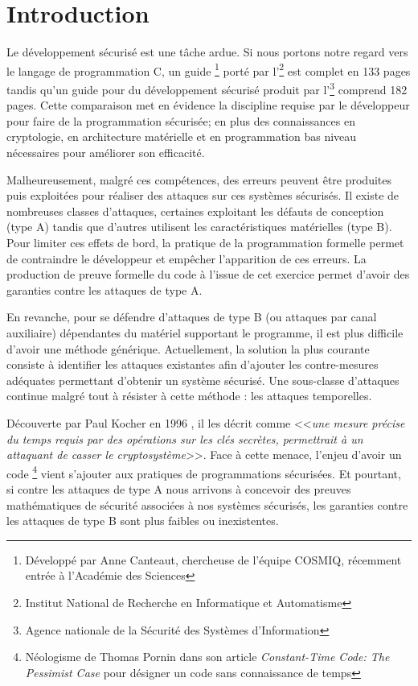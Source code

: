 \chapter*{Introduction}

Le développement sécurisé est une tâche ardue. Si nous portons notre regard vers le langage de programmation C, un guide \cite{progC_guide}\footnote{Développé par Anne Canteaut, chercheuse de l'équipe COSMIQ, récemment entrée à l'Académie des Sciences} porté par l'\footnote{Institut National de Recherche en Informatique et Automatisme} est complet en 133 pages tandis qu'un guide pour du développement sécurisé\cite{anssi_guideForSecureprogramming} produit par l'\footnote{Agence nationale de la Sécurité des Systèmes d'Information} comprend 182 pages. Cette comparaison met en évidence la discipline requise par le développeur pour faire de la programmation sécurisée; en plus des connaissances en cryptologie, en architecture matérielle et en programmation bas niveau nécessaires pour améliorer son efficacité. \medbreak

Malheureusement, malgré ces compétences, des erreurs peuvent être produites puis exploitées pour réaliser des attaques sur ces systèmes sécurisés. Il existe de nombreuses classes d'attaques, certaines exploitant les défauts de conception (type A) tandis que d'autres utilisent les caractéristiques matérielles (type B). Pour limiter ces effets de bord, la pratique de la programmation formelle permet de contraindre le développeur et empêcher l'apparition de ces erreurs. La production de preuve formelle du code à l'issue de cet exercice permet d'avoir des garanties contre les attaques de type A.

En revanche, pour se défendre d'attaques de type B (ou attaques par canal auxiliaire) dépendantes du matériel supportant le programme, il est plus difficile d'avoir une méthode générique. Actuellement, la solution la plus courante consiste à identifier les attaques existantes afin d'ajouter les contre-mesures adéquates permettant d'obtenir un système sécurisé. Une sous-classe d'attaques continue malgré tout à résister à cette méthode : les attaques temporelles.\medbreak

Découverte par Paul Kocher en 1996 \cite{crypto-1996-1469}, il les décrit comme <<\textit{une mesure précise du temps requis par des opérations sur les clés secrètes, permettrait à un attaquant de casser le cryptosystème}>>. Face à cette menace, l'enjeu d'avoir un code \textit{}\footnote{Néologisme de Thomas Pornin dans son article \textit{Constant-Time Code: The Pessimist Case} \cite{constantTimePornin} pour désigner un code sans connaissance de temps} vient s'ajouter aux pratiques de programmations sécurisées. Et pourtant, si contre les attaques de type A nous arrivons à concevoir des preuves mathématiques de sécurité associées à nos systèmes sécurisés, les garanties contre les attaques de type B sont plus faibles ou inexistentes.\medbreak

